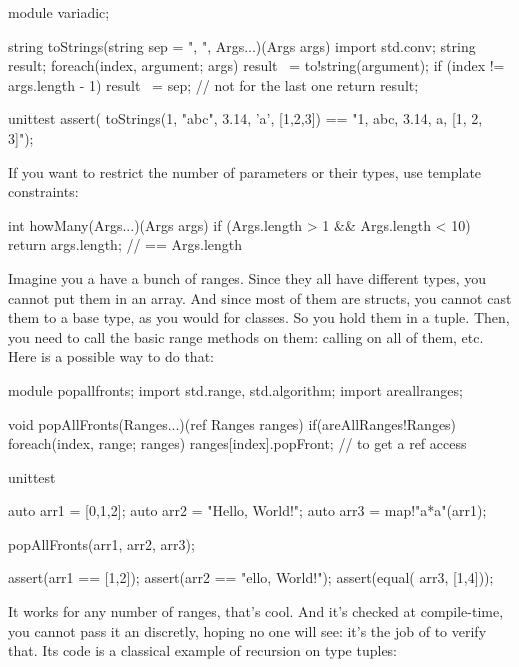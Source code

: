 \begin{dcode}
module variadic;

string toStrings(string sep = ", ", Args...)(Args args)
{
    import std.conv;
    string result;
    foreach(index, argument; args)
    {
        result ~= to!string(argument);
        if (index != args.length - 1) result ~= sep; // not for the last one
    }
    return result;
}

unittest
{
    assert( toStrings(1, "abc", 3.14, 'a', [1,2,3]) 
                  == "1, abc, 3.14, a, [1, 2, 3]"); 
}
\end{dcode}

If you want to restrict the number of parameters or their types, use template constraints:

\begin{dcode}
int howMany(Args...)(Args args) if (Args.length > 1 && Args.length < 10)
{
    return args.length; // == Args.length
}
\end{dcode}

Imagine you a have a bunch of ranges. Since they all have different types, you cannot put them in an array. And since most of them are structs, you cannot cast them to a base type, as you would for classes. So you hold them in a tuple. Then, you need to call the basic range methods on them: calling  on all of them, etc. Here is a possible way to do that:

\begin{dcode}
module popallfronts;
import std.range, std.algorithm;
import areallranges;

void popAllFronts(Ranges...)(ref Ranges ranges) 
    if(areAllRanges!Ranges)
{
    foreach(index, range; ranges) 
        ranges[index].popFront; // to get a ref access
}

unittest
{
    auto arr1 = [0,1,2];
    auto arr2 = "Hello, World!";
    auto arr3 = map!"a*a"(arr1);

    popAllFronts(arr1, arr2, arr3);

    assert(arr1 == [1,2]);
    assert(arr2 == "ello, World!");
    assert(equal( arr3, [1,4])); 
}
\end{dcode}

It works for any number of ranges, that's cool. And it's checked at compile-time, you cannot pass it an  discretly, hoping no one will see: it's the job of  to verify that. Its code is a classical example of recursion on type tuples:

